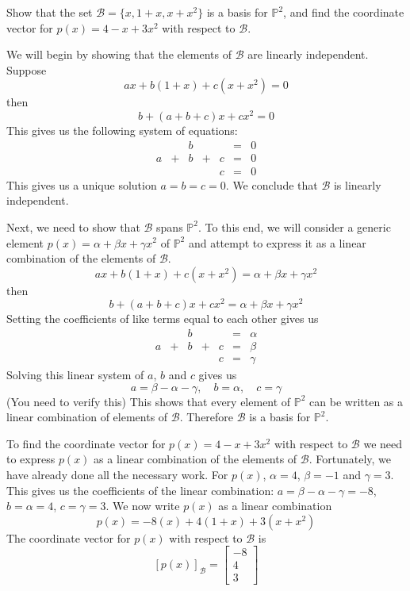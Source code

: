 \documentclass{ximera}
\begin{document}
\begin{example}\label{ex:coordvectorinpolyvectspace2}
Show that the set $\mathcal{B}=\{x, 1+x, x+x^2\}$ is a basis for $\mathbb{P}^2$, and find the coordinate vector for $p(x)=4-x+3x^2$ with respect to $\mathcal{B}$.
\begin{explanation}
We will begin by showing that the elements of $\mathcal{B}$ are linearly independent.  Suppose 
$$ax+b(1+x)+c(x+x^2)=0$$
then
$$b+(a+b+c)x+cx^2=0$$
This gives us the following system of equations:
$$\begin{array}{ccccccc}
     & &b&&&=&0\\
     a & +&b&+&c&= &0 \\
	 & &&&c&=&0
     \end{array}$$
This gives us a unique solution $a=b=c=0$.  We conclude that $\mathcal{B}$ is linearly independent.

Next, we need to show that $\mathcal{B}$ spans $\mathbb{P}^2$.  To this end, we will consider a generic element $p(x)=\alpha+\beta x+\gamma x^2$ of $\mathbb{P}^2$ and attempt to express it as a linear combination of the elements of $\mathcal{B}$.
$$ax+b(1+x)+c(x+x^2)=\alpha+\beta x+\gamma x^2$$
then
$$b+(a+b+c)x+cx^2=\alpha+\beta x+\gamma x^2$$
Setting the coefficients of like terms equal to each other gives us
$$\begin{array}{ccccccc}
     & &b&&&=&\alpha\\
     a & +&b&+&c&= &\beta \\
	 & &&&c&=&\gamma
     \end{array}$$
Solving this linear system of $a$, $b$ and $c$ gives us
$$a=\beta-\alpha-\gamma,\quad b=\alpha,\quad c=\gamma$$
(You need to verify this)  This shows that every element of $\mathbb{P}^2$ can be written as a linear combination of elements of $\mathcal{B}$.  Therefore $\mathcal{B}$ is a basis for $\mathbb{P}^2$.

To find the coordinate vector for $p(x)=4-x+3x^2$ with respect to $\mathcal{B}$ we need to express $p(x)$ as a linear combination of the elements of $\mathcal{B}$.  Fortunately, we have already done all the necessary work.  For $p(x)$, $\alpha=4$, $\beta=-1$ and $\gamma=3$.  This gives us the coefficients of the linear combination: $a=\beta-\alpha-\gamma=-8$, $b=\alpha=4$, $c=\gamma=3$.  We now write $p(x)$ as a linear combination
$$p(x)=-8(x)+4(1+x)+3(x+x^2)$$
The coordinate vector for $p(x)$ with respect to $\mathcal{B}$ is
$$[p(x)]_{\mathcal{B}}=\begin{bmatrix}-8\\4\\3\end{bmatrix}$$
\end{explanation}
\end{example}
\end{document}

